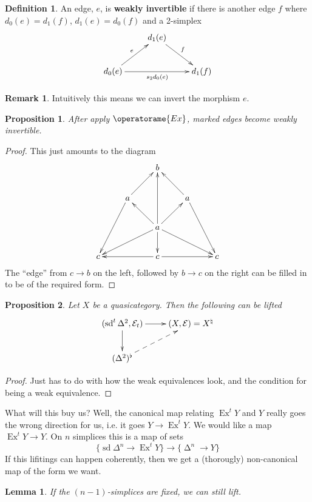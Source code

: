 \documentclass[english]{amsart}
\newcommand{\mc}{\mathcal}
\newcommand{\Ex}{\operatorame{Ex}}
\newtheorem*{lem}{Lemma}
\newtheorem*{prop}{Proposition}
\theoremstyle{definition}
\newtheorem*{defn}{Definition}
\newtheorem*{rmk}{Remark}
\begin{document}
\begin{defn}
An edge, $e$, is \textbf{weakly invertible} if there is another edge $f$ where $d_0 (e) = d_1 (f)$, $d_1 (e) = d_0 (f)$ and a 2-simplex
\[
\xymatrix{
 &  d_1 (e) \ar[dr]^f & \\
d_0 (e) \ar[ur]^e \ar[rr]_{s_2 d_0 (e)} & & d_1 (f) 
}
\]
\end{defn}

\begin{rmk}
Intuitively this means we can invert the morphism $e$. 
\end{rmk}

\begin{prop}
After apply $\Ex$, marked edges become weakly invertible. 
\end{prop}
\begin{proof}
This just amounts to the diagram
\[
\xymatrix{
 & & b & & \\
 & a\ar[ur]\ar[ddl] & & a \ar[ul]\ar[ddr]& \\
 & & a\ar[uu]\ar[dll]\ar[drr] \ar[ul]\ar[ur]\ar[d] & & \\
c & &c\ar[ll]\ar[rr] & & c
} 
\]
The ``edge'' from $c \to b$ on the left, followed by $b \to c$ on the right can be filled in to be of the required form. 
\end{proof}







\begin{prop}
Let $X$ be a quasicategory. Then the following can be lifted
\[
\xymatrix{
(\operatorname{sd}^t \Delta^2, \mc{E}_t) \ar[d]\ar[r] & (X,\mc{E}) = X^\natural\\
(\Delta^2)^\flat \ar@{-->}[ur] & 
}
\]
\end{prop}
\begin{proof}
Just has to do with how the weak equivalences look, and the condition for being a weak equivalence. 
\end{proof}

What will this buy us? Well, the canonical map relating $\operatorname{Ex}^t Y$ and $Y$ really goes the wrong direction for us, i.e. it goes $Y \to \operatorname{Ex}^t Y$. We would like a map $\operatorname{Ex}^t Y \to Y$. On $n$ simplices this is a map of sets
\[
\{\operatorname{sd} \Delta^n \to \operatorname{Ex}^t Y\} \to \{\operatorname{\Delta}^n \to Y\}
\]
If this lifitings can happen coherently, then we get a (thorougly) non-canonical map of the form we want. 

\begin{lem}
If the $(n-1)$-simplices are fixed, we can still lift. 
\end{lem}
\end{document}

